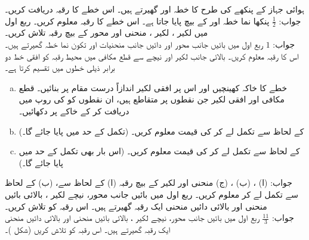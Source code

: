 ہوائی جہاز کے پنکھے کی طرح کا خطہ  اور  گھیرتے ہیں۔ اس خطے کا رقبہ دریافت کریں۔\\
جواب:\quad
$\tfrac{1}{2}$
پنکھا نما خطہ  اور  کے بیچ پایا جاتا ہے۔ اس خطے کا رقبہ معلوم کریں۔
ربع اول میں لکیر ، لکیر ، منحنی  اور   محور کے بیچ رقبہ تلاش کریں۔\\
جواب:\quad
$1$
ربع اول میں بائیں جانب  محور اور دائیں جانب منحنیات  اور  تکون نما خطہ گھیرتے ہیں۔ اس کا رقبہ معلوم کریں۔
بالائی جانب لکیر  اور نیچے سے قطع مکافی   میں محیط رقبہ کو افقی خط  دو برابر ذیلی خطوں میں تقسیم کرتا ہے۔
\begin{enumerate}[a.]
\item
خطے کا خاکہ کھینچیں اور اس پر افقی لکیر  اندازاً درست مقام پر بنائیں۔ قطع مکافی اور افقی لکیر جن نقطوں پر متقاطع ہیں، ان نقطوں کو  کی روپ میں دریافت کر کے خاکے پر دکھائیں۔
\item
{} کے لحاظ سے تکمل لے کر  کی قیمت معلوم کریں۔ (تکمل کے حد میں  پایا جائے گا۔)
\item
{} کے لحاظ سے تکمل لے کر  کی قیمت معلوم کریں۔ (اس بار بھی تکمل کے حد میں  پایا جائے گا۔)
\end{enumerate}
جواب:\quad
(ا) ، (ب) ، (ج) 
منحنی  اور لکیر  کے بیچ رقبہ (ا)  کے لحاظ سے، (ب)  کے لحاظ سے تکمل لے کر معلوم کریں۔
ربع اول میں بائیں جانب  محور، نیچے لکیر ، بالائی بائیں منحنی  اور بالائی دائیں منحنی  ایک رقبہ گھیرتے ہیں۔ اس رقبہ کو تلاش کریں۔\\
جواب:\quad
$\tfrac{11}{3}$
ربع اول میں بائیں جانب  محور، نیچے لکیر ، بالائی بائیں منحنی  اور بالائی دائیں
 منحنی  ایک رقبہ گھیرتے ہیں۔ اس رقبہ کو تلاش کریں (شکل )۔
